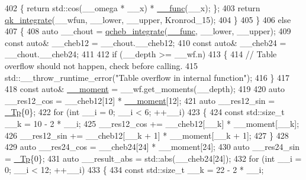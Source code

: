 \begin{DoxyCode}
402                             \{ \textcolor{keywordflow}{return} std::cos(\_\_omega * \_\_x) * \hyperlink{namespace____gnu__cxx_af2b2f0c7a2ae72b922b1afefae5a65b2}{\_\_func}(\_\_x); \};
403               \textcolor{keywordflow}{return} \hyperlink{namespace____gnu__cxx_a02cfb416b1f1cc3a5dd2b12af3877bd4}{qk\_integrate}(\_\_wfun, \_\_lower, \_\_upper, Kronrod\_15);
404             \}
405         \}
406       \textcolor{keywordflow}{else}
407         \{
408           \textcolor{keyword}{auto} \_\_chout = \hyperlink{namespace____gnu__cxx_aa8e32fefb92558e0c8ddb94c25fd637b}{qcheb\_integrate}(\hyperlink{namespace____gnu__cxx_af2b2f0c7a2ae72b922b1afefae5a65b2}{\_\_func}, \_\_lower, \_\_upper);
409           \textcolor{keyword}{const} \textcolor{keyword}{auto}& \_\_cheb12 = \_\_chout.\_\_cheb12;
410           \textcolor{keyword}{const} \textcolor{keyword}{auto}& \_\_cheb24 = \_\_chout.\_\_cheb24;
411 
412           \textcolor{keywordflow}{if} (\_\_depth >= \_\_wf.n)
413             \{
414               \textcolor{comment}{// Table overflow should not happen, check before calling.}
415               std::\_\_throw\_runtime\_error(\textcolor{stringliteral}{"Table overflow in internal function"});
416             \}
417 
418           \textcolor{keyword}{const} \textcolor{keyword}{auto}& \hyperlink{namespace____gnu__cxx_aa353478f1f8d25130d4fc48bf804a24c}{\_\_moment} = \_\_wf.get\_moments(\_\_depth);
419 
420           \textcolor{keyword}{auto} \_\_res12\_cos = \_\_cheb12[12] * \hyperlink{namespace____gnu__cxx_aa353478f1f8d25130d4fc48bf804a24c}{\_\_moment}[12];
421           \textcolor{keyword}{auto} \_\_res12\_sin = \hyperlink{namespace____gnu__cxx_a3b19a9c800ca194374ef9172290f7d79}{\_Tp}\{0\};
422           \textcolor{keywordflow}{for} (\textcolor{keywordtype}{int} \_\_i = 0; \_\_i < 6; ++\_\_i)
423             \{
424               \textcolor{keyword}{const} std::size\_t \_\_k = 10 - 2 * \_\_i;
425               \_\_res12\_cos += \_\_cheb12[\_\_k] * \_\_moment[\_\_k];
426               \_\_res12\_sin += \_\_cheb12[\_\_k + 1] * \_\_moment[\_\_k + 1];
427             \}
428 
429           \textcolor{keyword}{auto} \_\_res24\_cos = \_\_cheb24[24] * \_\_moment[24];
430           \textcolor{keyword}{auto} \_\_res24\_sin = \hyperlink{namespace____gnu__cxx_a3b19a9c800ca194374ef9172290f7d79}{\_Tp}\{0\};
431           \textcolor{keyword}{auto} \_\_result\_abs = std::abs(\_\_cheb24[24]);
432           \textcolor{keywordflow}{for} (\textcolor{keywordtype}{int} \_\_i = 0; \_\_i < 12; ++\_\_i)
433             \{
434               \textcolor{keyword}{const} std::size\_t \_\_k = 22 - 2 * \_\_i;

\end{DoxyCode}
